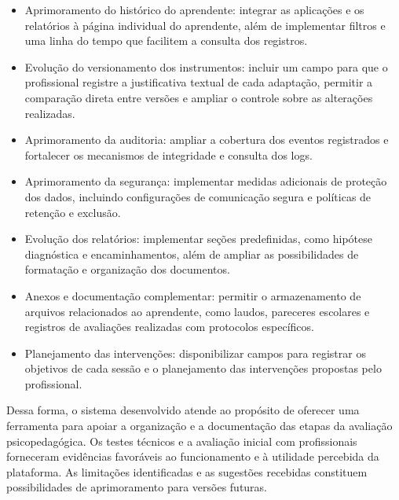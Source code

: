 \begin{itemize}
    \item Aprimoramento do histórico do aprendente: integrar as aplicações e os relatórios à página individual do aprendente, além de implementar filtros e uma linha do tempo que facilitem a consulta dos registros.
    \item Evolução do versionamento dos instrumentos: incluir um campo para que o profissional registre a justificativa textual de cada adaptação, permitir a comparação direta entre versões e ampliar o controle sobre as alterações realizadas.
    \item Aprimoramento da auditoria: ampliar a cobertura dos eventos registrados e fortalecer os mecanismos de integridade e consulta dos logs.
    \item Aprimoramento da segurança: implementar medidas adicionais de proteção dos dados, incluindo configurações de comunicação segura e políticas de retenção e exclusão.
    \item Evolução dos relatórios: implementar seções predefinidas, como hipótese diagnóstica e encaminhamentos, além de ampliar as possibilidades de formatação e organização dos documentos.
    \item Anexos e documentação complementar: permitir o armazenamento de arquivos relacionados ao aprendente, como laudos, pareceres escolares e registros de avaliações realizadas com protocolos específicos.
    \item Planejamento das intervenções: disponibilizar campos para registrar os objetivos de cada sessão e o planejamento das intervenções propostas pelo profissional.
\end{itemize}

Dessa forma, o sistema desenvolvido atende ao propósito de oferecer uma ferramenta para apoiar a organização e a documentação das etapas da avaliação psicopedagógica. Os testes técnicos e a avaliação inicial com profissionais forneceram evidências favoráveis ao funcionamento e à utilidade percebida da plataforma. As limitações identificadas e as sugestões recebidas constituem possibilidades de aprimoramento para versões futuras.
